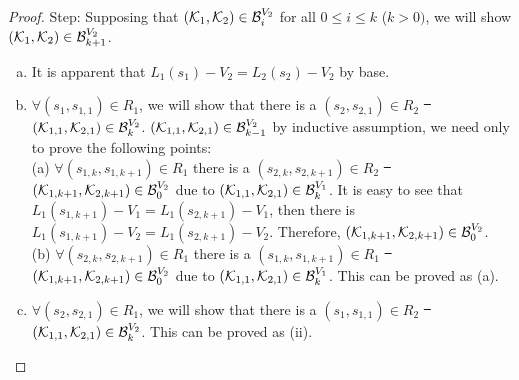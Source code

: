 \documentclass[letterpaper]{article} %
\begin{document}
\begin{proof}
Step: Supposing that $({\cal K}_1, {\cal K}_2) \in {\cal B}_i^{V_2}$ for all $0 \leq i \leq k$ ($k > 0)$, we will show $({\cal K}_1, {\cal K}_2) \in {\cal B}_{k+1}^{V_2}$.
\begin{enumerate} [(a)]
  \item It is apparent that $L_1(s_1) - V_2 = L_2(s_2) - V_2$ by base.
  \item $\forall (s_1, s_{1,1}) \in R_1$, we will show that there is a $(s_2, s_{2, 1}) \in R_2$ \st\ $({\cal K}_{1,1}, {\cal K}_{2,1})\in {\cal B}_k^{V_2}$. $({\cal K}_{1,1}, {\cal K}_{2,1})\in {\cal B}_{k-1}^{V_2}$ by inductive assumption, we need only to prove the following points:\\
      (a) $\forall (s_{1, k}, s_{1, k+1}) \in R_1$ there is a $(s_{2, k}, s_{2, k+1})\in R_2$ \st\ $({\cal K}_{1,k+1}, {\cal K}_{2,k+1})\in {\cal B}_0^{V_2}$ due to $({\cal K}_{1,1}, {\cal K}_{2,1})\in {\cal B}_{k}^{V_1}$. It is easy to see that $L_1(s_{1, k+1}) - V_1 = L_1(s_{2, k+1}) - V_1$, then there is $L_1(s_{1, k+1})- V_2 = L_1(s_{2, k+1}) - V_2$. Therefore, $({\cal K}_{1,k+1}, {\cal K}_{2,k+1})\in {\cal B}_0^{V_2}$.\\
      (b) $\forall (s_{2, k}, s_{2, k+1}) \in R_1$ there is a $(s_{1, k}, s_{1, k+1}) \in R_1$ \st\ $({\cal K}_{1,k+1}, {\cal K}_{2,k+1})\in {\cal B}_0^{V_2}$ due to $({\cal K}_{1,1}, {\cal K}_{2,1})\in {\cal B}_{k}^{V_1}$. This can be proved as (a).
  \item $\forall (s_2, s_{2,1}) \in R_1$, we will show that there is a $(s_1, s_{1, 1}) \in R_2$ \st\ $({\cal K}_{1,1}, {\cal K}_{2,1})\in {\cal B}_k^{V_2}$. This can be proved as (ii).
\end{enumerate}

\end{proof}

\end{document}
